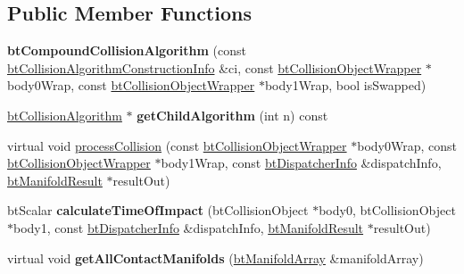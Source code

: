 \subsection*{Public Member Functions}
\begin{DoxyCompactItemize}
\item 
\hypertarget{classbt_compound_collision_algorithm_acb81b191f56f62a703723fe32523b505}{{\bfseries bt\+Compound\+Collision\+Algorithm} (const \hyperlink{structbt_collision_algorithm_construction_info}{bt\+Collision\+Algorithm\+Construction\+Info} \&ci, const \hyperlink{structbt_collision_object_wrapper}{bt\+Collision\+Object\+Wrapper} $\ast$body0\+Wrap, const \hyperlink{structbt_collision_object_wrapper}{bt\+Collision\+Object\+Wrapper} $\ast$body1\+Wrap, bool is\+Swapped)}\label{classbt_compound_collision_algorithm_acb81b191f56f62a703723fe32523b505}

\item 
\hypertarget{classbt_compound_collision_algorithm_a0e6dd9fcc06de8a77013e5ae9007f697}{\hyperlink{classbt_collision_algorithm}{bt\+Collision\+Algorithm} $\ast$ {\bfseries get\+Child\+Algorithm} (int n) const }\label{classbt_compound_collision_algorithm_a0e6dd9fcc06de8a77013e5ae9007f697}

\item 
virtual void \hyperlink{classbt_compound_collision_algorithm_a173ce993461795e0572dd2924c54cdc0}{process\+Collision} (const \hyperlink{structbt_collision_object_wrapper}{bt\+Collision\+Object\+Wrapper} $\ast$body0\+Wrap, const \hyperlink{structbt_collision_object_wrapper}{bt\+Collision\+Object\+Wrapper} $\ast$body1\+Wrap, const \hyperlink{structbt_dispatcher_info}{bt\+Dispatcher\+Info} \&dispatch\+Info, \hyperlink{classbt_manifold_result}{bt\+Manifold\+Result} $\ast$result\+Out)
\item 
\hypertarget{classbt_compound_collision_algorithm_aa223c7b4af581c9050a7ad20a1309ac0}{bt\+Scalar {\bfseries calculate\+Time\+Of\+Impact} (bt\+Collision\+Object $\ast$body0, bt\+Collision\+Object $\ast$body1, const \hyperlink{structbt_dispatcher_info}{bt\+Dispatcher\+Info} \&dispatch\+Info, \hyperlink{classbt_manifold_result}{bt\+Manifold\+Result} $\ast$result\+Out)}\label{classbt_compound_collision_algorithm_aa223c7b4af581c9050a7ad20a1309ac0}

\item 
\hypertarget{classbt_compound_collision_algorithm_a317a7f5e99fca79e6caaa267274ca0dc}{virtual void {\bfseries get\+All\+Contact\+Manifolds} (\hyperlink{classbt_aligned_object_array}{bt\+Manifold\+Array} \&manifold\+Array)}\label{classbt_compound_collision_algorithm_a317a7f5e99fca79e6caaa267274ca0dc}

\end{DoxyCompactItemize}
